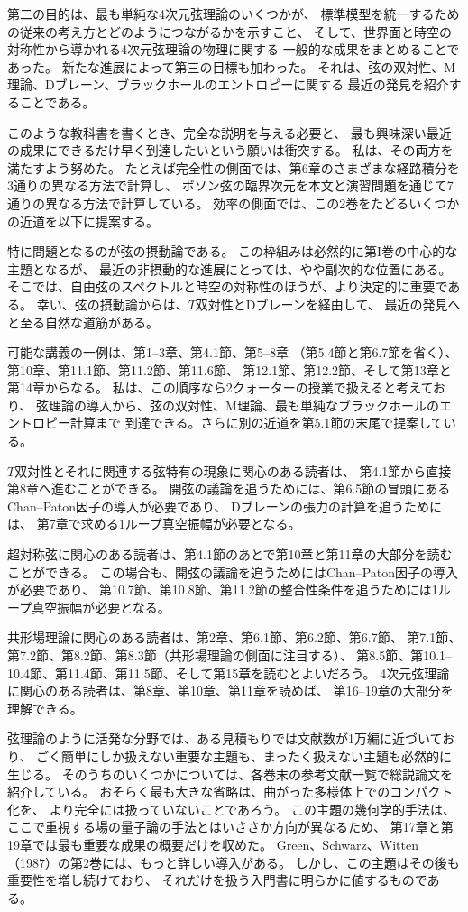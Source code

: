 第二の目的は、最も単純な4次元弦理論のいくつかが、
標準模型を統一するための従来の考え方とどのようにつながるかを示すこと、
そして、世界面と時空の対称性から導かれる4次元弦理論の物理に関する
一般的な成果をまとめることであった。
新たな進展によって第三の目標も加わった。
それは、弦の双対性、M理論、Dブレーン、ブラックホールのエントロピーに関する
最近の発見を紹介することである。

このような教科書を書くとき、完全な説明を与える必要と、
最も興味深い最近の成果にできるだけ早く到達したいという願いは衝突する。
私は、その両方を満たすよう努めた。
たとえば完全性の側面では、第6章のさまざまな経路積分を3通りの異なる方法で計算し、
ボソン弦の臨界次元を本文と演習問題を通じて7通りの異なる方法で計算している。
効率の側面では、この2巻をたどるいくつかの近道を以下に提案する。

特に問題となるのが弦の摂動論である。
この枠組みは必然的に第I巻の中心的な主題となるが、
最近の非摂動的な進展にとっては、やや副次的な位置にある。
そこでは、自由弦のスペクトルと時空の対称性のほうが、より決定的に重要である。
幸い、弦の摂動論からは、$T$双対性とDブレーンを経由して、
最近の発見へと至る自然な道筋がある。

可能な講義の一例は、第1--3章、第4.1節、第5--8章
（第5.4節と第6.7節を省く）、第10章、第11.1節、第11.2節、第11.6節、
第12.1節、第12.2節、そして第13章と第14章からなる。
私は、この順序なら2クォーターの授業で扱えると考えており、
弦理論の導入から、弦の双対性、M理論、最も単純なブラックホールのエントロピー計算まで
到達できる。さらに別の近道を第5.1節の末尾で提案している。

$T$双対性とそれに関連する弦特有の現象に関心のある読者は、
第4.1節から直接第8章へ進むことができる。
開弦の議論を追うためには、第6.5節の冒頭にあるChan--Paton因子の導入が必要であり、
Dブレーンの張力の計算を追うためには、
第7章で求める1ループ真空振幅が必要となる。

超対称弦に関心のある読者は、第4.1節のあとで第10章と第11章の大部分を読むことができる。
この場合も、開弦の議論を追うためにはChan--Paton因子の導入が必要であり、
第10.7節、第10.8節、第11.2節の整合性条件を追うためには1ループ真空振幅が必要となる。

共形場理論に関心のある読者は、第2章、第6.1節、第6.2節、第6.7節、
第7.1節、第7.2節、第8.2節、第8.3節（共形場理論の側面に注目する）、
第8.5節、第10.1--10.4節、第11.4節、第11.5節、そして第15章を読むとよいだろう。
4次元弦理論に関心のある読者は、第8章、第10章、第11章を読めば、
第16--19章の大部分を理解できる。

弦理論のように活発な分野では、ある見積もりでは文献数が1万編に近づいており、
ごく簡単にしか扱えない重要な主題も、まったく扱えない主題も必然的に生じる。
そのうちのいくつかについては、各巻末の参考文献一覧で総説論文を紹介している。
おそらく最も大きな省略は、曲がった多様体上でのコンパクト化を、
より完全には扱っていないことであろう。
この主題の幾何学的手法は、ここで重視する場の量子論の手法とはいささか方向が異なるため、
第17章と第19章では最も重要な成果の概要だけを収めた。
Green、Schwarz、Witten（1987）\cite{Green:1987mn}の第2巻には、もっと詳しい導入がある。
しかし、この主題はその後も重要性を増し続けており、
それだけを扱う入門書に明らかに値するものである。

